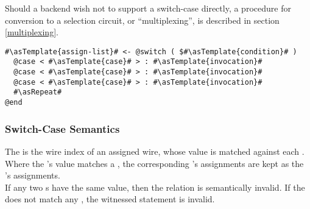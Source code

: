 Should a backend wish not to support a switch-case directly, a procedure for conversion to a selection circuit, or ``multiplexing'', is described in section \ref{multiplexing}.\\

\begin{lstlisting}
#\asTemplate{assign-list}# <- @switch ( $#\asTemplate{condition}# )
  @case < #\asTemplate{case}# > : #\asTemplate{invocation}# 
  @case < #\asTemplate{case}# > : #\asTemplate{invocation}# 
  @case < #\asTemplate{case}# > : #\asTemplate{invocation}# 
  #\asRepeat#
@end
\end{lstlisting}



\subsubsection*{Switch-Case Semantics}
The  is the wire index of an assigned wire, whose value is matched against each .
Where the 's value matches a , the corresponding 's assignments are kept as the 's assignments.\\

If any two s have the same value, then the relation is semantically invalid.
If the  does not match any , the witnessed statement is invalid.\\

